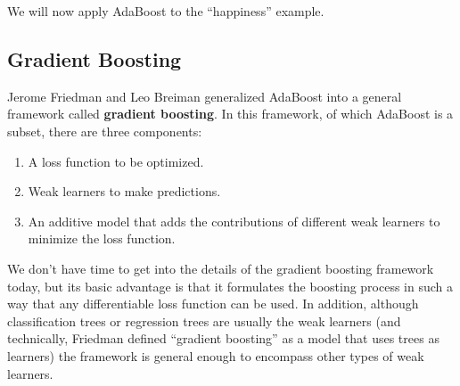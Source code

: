 We will now apply AdaBoost to the ``happiness'' example.


\subsection{Gradient Boosting}

Jerome Friedman and Leo Breiman generalized AdaBoost into a general framework called \textbf{gradient boosting}. In this framework, of which AdaBoost is a subset, there are three components:

\begin{enumerate}
\item A loss function to be optimized.
\item Weak learners to make predictions.
\item An additive model that adds the contributions of different weak learners to minimize the loss function.
\end{enumerate}

We don't have time to get into the details of the gradient boosting framework today, but its basic advantage is that it formulates the boosting process in such a way that any differentiable loss function can be used. In addition, although classification trees or regression trees are usually the weak learners (and technically, Friedman defined ``gradient boosting'' as a model that uses trees as learners) the framework is general enough to encompass other types of weak learners. 

